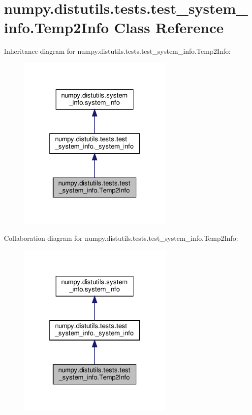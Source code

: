 \hypertarget{classnumpy_1_1distutils_1_1tests_1_1test__system__info_1_1Temp2Info}{}\section{numpy.\+distutils.\+tests.\+test\+\_\+system\+\_\+info.\+Temp2\+Info Class Reference}
\label{classnumpy_1_1distutils_1_1tests_1_1test__system__info_1_1Temp2Info}


Inheritance diagram for numpy.\+distutils.\+tests.\+test\+\_\+system\+\_\+info.\+Temp2\+Info\+:
\nopagebreak
\begin{figure}[H]
\begin{center}
\leavevmode
\includegraphics[width=217pt]{classnumpy_1_1distutils_1_1tests_1_1test__system__info_1_1Temp2Info__inherit__graph}
\end{center}
\end{figure}


Collaboration diagram for numpy.\+distutils.\+tests.\+test\+\_\+system\+\_\+info.\+Temp2\+Info\+:
\nopagebreak
\begin{figure}[H]
\begin{center}
\leavevmode
\includegraphics[width=217pt]{classnumpy_1_1distutils_1_1tests_1_1test__system__info_1_1Temp2Info__coll__graph}
\end{center}
\end{figure}
